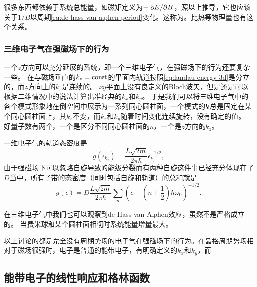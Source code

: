 很多东西都依赖于系统总能量，如磁矩定义为$- \pdv*{E}{B}$，照以上推导，它也应该关于$1/B$以周期\eqref{eq:de-hass-van-alphen-period}变化。这称为。比热等物理量也有这个关系。


\subsubsection{三维电子气在强磁场下的行为}

一个$z$方向可以充分延展的系统，即一个三维电子气，在强磁场下的行为还要复杂一些。
在与磁场垂直的$k_z=\mathrm{const}$的平面内轨道按照\eqref{eq:landau-energy-3d}是分立的，而$z$方向上的$k_z$是连续的。
$xy$平面上没有良定义的Bloch波矢，但是还是可以根据二维情况中的说法计算出准经典的$k_x$和$k_y$。
于是我们可以将三维电子气中的各个模式形象地在倒空间中展示为一系列同心圆柱面，一个模式的$\vb*{k}$总是固定在某个同心圆柱面上，其$k_z$不变，而$k_x$和$k_y$随着时间变化连续旋转，没有确定的值。
好量子数有两个，一个是区分不同同心圆柱面的$n$，一个是$z$方向的$k_z$。

一维电子气的轨道态密度是
\begin{equation}
    g(\epsilon_{k_z}) = \frac{L \sqrt{2m}}{2 \pi \hbar} \epsilon_{k_z}^{-1/2},
\end{equation}
由于强磁场下可以忽略自旋导致的能级分裂而有两种自旋这件事已经充分体现在了$D$当中，所有子带的态密度（同时包括自旋和轨道）的总和就是
\begin{equation}
    g(\epsilon) = D \frac{L \sqrt{2m}}{2 \pi \hbar} \sum_n \left(\epsilon - \left( n + \frac{1}{2} \right) \hbar \omega_0 \right)^{-1/2}.
\end{equation}

在三维电子气中我们也可以观察到de Hass-van Alphen效应，虽然不是严格成立的。
当费米球和某个圆柱面相切时系统能量增量最大。

以上讨论的都是完全没有周期势场的电子气在强磁场下的行为。在晶格周期势场相对于磁场很强时，电子是普通的能带电子，有明确定义的$k_x$和$k_y$，而

\subsection{能带电子的线性响应和格林函数}


